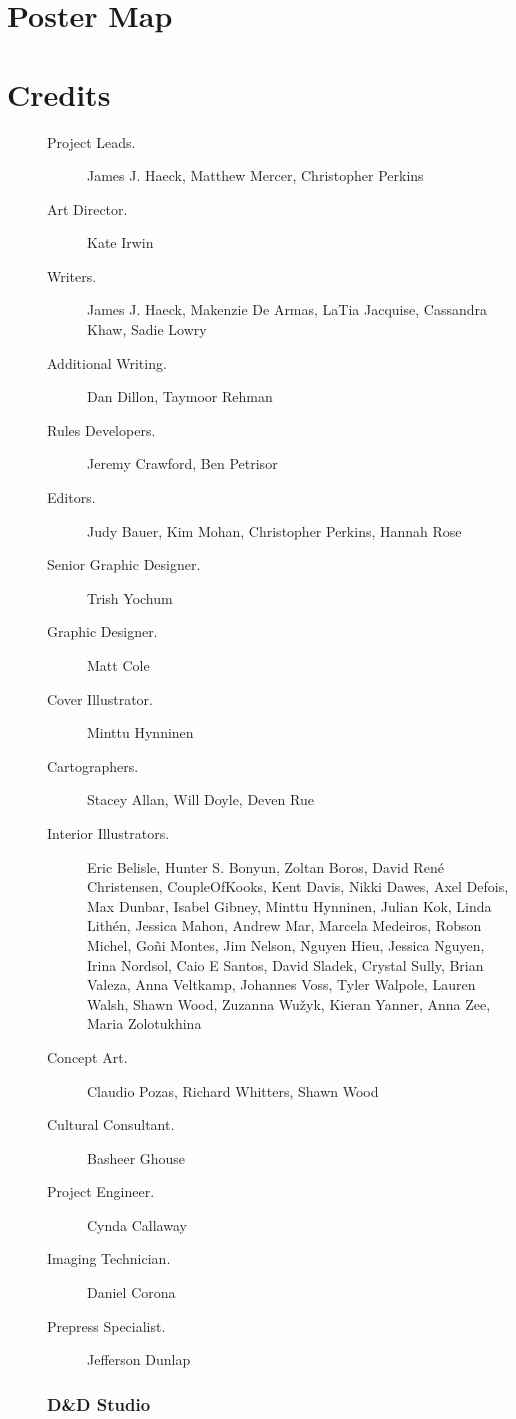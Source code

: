 \documentclass[a4paper, 11pt, bg=full, twocolumn, nooutline]{dndbook}
\begin{document}
\chapter{Poster Map}\label{ch:poster-map-14-14}


\chapter{Credits}\label{ch:credits-15-15}

\begin{description}
\item[\mbox{}] \begin{description}
\item[Project Leads.] James J. Haeck, Matthew Mercer, Christopher Perkins
\item[Art Director.] Kate Irwin
\item[Writers.] James J. Haeck, Makenzie De Armas, LaTia Jacquise, Cassandra Khaw, Sadie Lowry
\item[Additional Writing.] Dan Dillon, Taymoor Rehman
\item[Rules Developers.] Jeremy Crawford, Ben Petrisor
\item[Editors.] Judy Bauer, Kim Mohan, Christopher Perkins, Hannah Rose
\item[Senior Graphic Designer.] Trish Yochum
\item[Graphic Designer.] Matt Cole
\item[Cover Illustrator.] Minttu Hynninen
\item[Cartographers.] Stacey Allan, Will Doyle, Deven Rue
\item[Interior Illustrators.] Eric Belisle, Hunter S. Bonyun, Zoltan Boros, David René Christensen, CoupleOfKooks, Kent Davis, Nikki Dawes, Axel Defois, Max Dunbar, Isabel Gibney, Minttu Hynninen, Julian Kok, Linda Lithén, Jessica Mahon, Andrew Mar, Marcela Medeiros, Robson Michel, Goñi Montes, Jim Nelson, Nguyen Hieu, Jessica Nguyen, Irina Nordsol, Caio E Santos, David Sladek, Crystal Sully, Brian Valeza, Anna Veltkamp, Johannes Voss, Tyler Walpole, Lauren Walsh, Shawn Wood, Zuzanna Wužyk, Kieran Yanner, Anna Zee, Maria Zolotukhina
\item[Concept Art.] Claudio Pozas, Richard Whitters, Shawn Wood
\item[Cultural Consultant.] Basheer Ghouse
\item[Project Engineer.] Cynda Callaway
\item[Imaging Technician.] Daniel Corona
\item[Prepress Specialist.] Jefferson Dunlap
\end{description}
\item[\mbox{}] \subsection{D\&D Studio}


\end{description}
\end{document}
